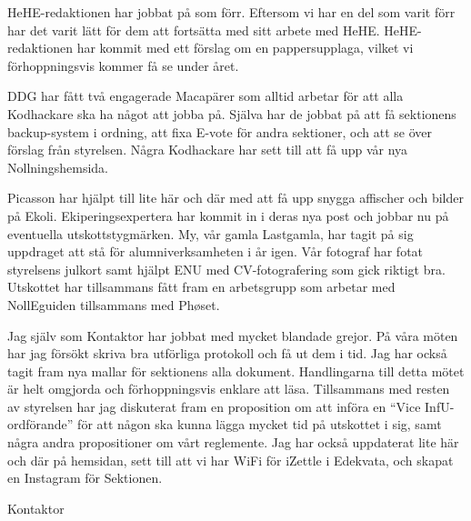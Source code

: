 \documentclass[../_main/handlingar.tex]{subfiles}
\begin{document}

HeHE-redaktionen har jobbat på som förr. Eftersom vi har en del som varit förr har det varit lätt för dem att fortsätta med sitt arbete med HeHE. HeHE-redaktionen har kommit med ett förslag om en pappersupplaga, vilket vi förhoppningsvis kommer få se under året.

DDG har fått två engagerade Macapärer som alltid arbetar för att alla Kodhackare ska ha något att jobba på. Själva har de jobbat på att få sektionens backup-system i ordning, att fixa E-vote för andra sektioner, och att se över förslag från styrelsen. Några Kodhackare har sett till att få upp vår nya Nollningshemsida.

Picasson har hjälpt till lite här och där med att få upp snygga affischer och bilder på Ekoli. Ekiperingsexpertera har kommit in i deras nya post och jobbar nu på eventuella utskottstygmärken. My, vår gamla Lastgamla, har tagit på sig uppdraget att stå för alumniverksamheten i år igen. Vår fotograf har fotat styrelsens julkort samt hjälpt ENU med CV-fotografering som gick riktigt bra. Utskottet har tillsammans fått fram en arbetsgrupp som arbetar med NollEguiden tillsammans med Phøset.

Jag själv som Kontaktor har jobbat med mycket blandade grejor. På våra möten har jag försökt skriva bra utförliga protokoll och få ut dem i tid. Jag har också tagit fram nya mallar för sektionens alla dokument. Handlingarna till detta mötet är helt omgjorda och förhoppningsvis enklare att läsa. Tillsammans med resten av styrelsen har jag diskuterat fram en proposition om att införa en ``Vice InfU-ordförande'' för att någon ska kunna lägga mycket tid på utskottet i sig, samt några andra propositioner om vårt reglemente. Jag har också uppdaterat lite här och där på hemsidan, sett till att vi har WiFi för iZettle i Edekvata, och skapat en Instagram för Sektionen.

\begin{signatures}{1}
    \mvh
    \signature{Erik Månsson}{Kontaktor}
\end{signatures}
\end{document}
